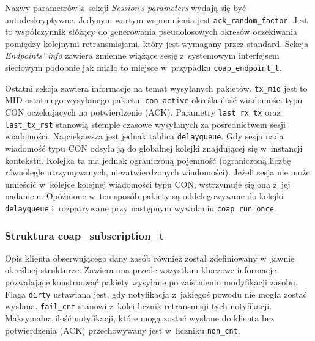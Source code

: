 Nazwy parametrów z~sekcji \textit{Session's parameters} wydają się być autodeskryptywne. Jedynym wartym wspomnienia jest \verb|ack_random_factor|. Jest to współczynnik słóżący do generowania pseudolosowych okresów oczekiwania pomiędzy kolejnymi retransmisjami, który jest wymagany przez standard. Sekcja \textit{Endpoints' info} zawiera zmienne wiążące sesję z~systemowym interfejsem sieciowym podobnie jak miało to miejsce w~przypadku \verb|coap_endpoint_t|.

Ostatni sekcja zawiera informacje na temat wysyłanych pakietów. \verb|tx_mid| jest to MID ostatniego wysyłanego pakietu. \verb|con_active| określa ilość wiadomości typu CON oczekujących na potwierdzenie (ACK). Parametry \verb|last_rx_tx| oraz \verb|last_tx_rst| stanowią stemple czasowe wysyłanych za pośrednictwem sesji wiadomości. Najciekawsza jest jednak tablica \verb|delayqueue|. Gdy sesja nada wiadomość typu CON odsyła ją do globalnej kolejki znajdującej się w~instancji kontekstu. Kolejka ta ma jednak ograniczoną pojemność (ograniczoną liczbę równolegle utrzymywanych, niezatwierdzonych wiadomości). Jeżeli sesja nie może umieścić w~kolejce kolejnej wiadomości typu CON, wstrzymuje się ona z~jej nadaniem. Opóźnione w~ten sposób pakiety są oddelegowywane do kolejki \verb|delayqueue| i~rozpatrywane przy następnym wywołaniu \verb|coap_run_once|.\\



\subsubsection{Struktura coap\_subscription\_t}

\vspace{0.5cm}

\vspace{0.5cm}

Opis klienta obserwującego dany zasób również został zdefiniowany w~jawnie określnej strukturze. Zawiera ona przede wszystkim kluczowe informacje pozwalające konstruować pakiety wysyłane po zaistnieniu modyfikacji zasobu. Flaga \verb|dirty| ustawiana jest, gdy notyfikacja z~jakiegoś powodu nie mogła zostać wysłana. \verb|fail_cnt| stanowi z~kolei licznik retransmisji tych notyfikacji. Maksymalna ilość notyfikacji, które mogą zostać wysłane do klienta bez potwierdzenia (ACK) przechowywany jest w~liczniku \verb|non_cnt|.

